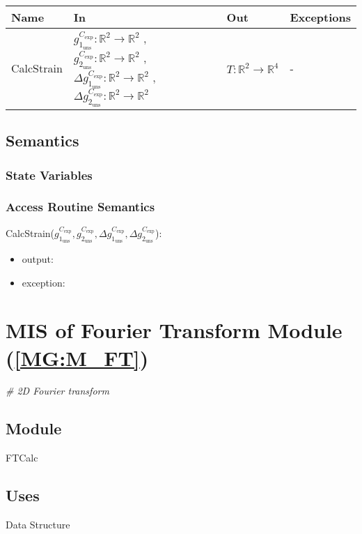 \documentclass[12pt, titlepage]{article}
\begin{document}
\begin{center}
\begin{tabular}{p{2cm} p{4cm} p{4cm} p{2cm}}
\hline
\textbf{Name} & \textbf{In} & \textbf{Out} & \textbf{Exceptions} \\
\hline
CalcStrain & $g_{1_{{\text{uns}}}}^{C_{\text{exp}}}:\mathbb{R}^2\rightarrow\mathbb{R}^2$ , $g_{2_{{\text{uns}}}}^{C_{\text{exp}}}:\mathbb{R}^2\rightarrow\mathbb{R}^2$ , $\Delta g_{1_{{\text{uns}}}}^{C_{\text{exp}}}:\mathbb{R}^2\rightarrow\mathbb{R}^2$ , $\Delta g_{2_{{\text{uns}}}}^{C_{\text{exp}}}:\mathbb{R}^2\rightarrow\mathbb{R}^2$  & $T:\mathbb{R}^2\rightarrow\mathbb{R}^4$ & - \\
\hline
\end{tabular}
\end{center}

\subsection{Semantics}

\subsubsection{State Variables}


\subsubsection{Access Routine Semantics}

\noindent CalcStrain($g_{1_{{\text{uns}}}}^{C_{\text{exp}}},g_{2_{{\text{uns}}}}^{C_{\text{exp}}},\Delta g_{1_{{\text{uns}}}}^{C_{\text{exp}}},\Delta g_{2_{{\text{uns}}}}^{C_{\text{exp}}}$):
\begin{itemize}
\item output:  
\item exception:  
\end{itemize}

\section{MIS of Fourier Transform Module (\texorpdfstring{\cref{MG:M_FT}}))} \label{MIS_FT}
\textit{{\#} 2D Fourier transform}
\subsection{Module}
FTCalc
\subsection{Uses}
Data Structure
\end{document}
